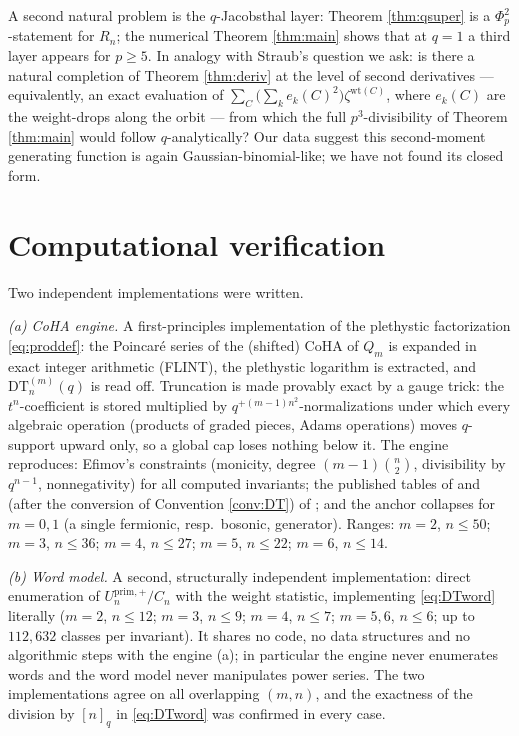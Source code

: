 \documentclass[11pt]{amsart}
\theoremstyle{definition}
\newcommand{\DT}{\mathrm{DT}}
\newcommand{\wt}{\mathrm{wt}}
\newcommand{\prim}{\mathrm{prim}}
\begin{document}
A second natural problem is the $q$-Jacobsthal layer: Theorem \ref{thm:qsuper} is a $\Phi_p^2$-statement for $R_n$; the numerical Theorem \ref{thm:main} shows that at $q=1$ a third layer appears for $p\ge5$. In analogy with Straub's question \cite[Rem.~6]{Straub} we ask: is there a natural completion of Theorem \ref{thm:deriv} at the level of second derivatives --- equivalently, an exact evaluation of $\sum_{C}\big(\sum_k e_k(C)^2\big)\zeta^{\wt(C)}$, where $e_k(C)$ are the weight-drops along the orbit --- from which the full $p^3$-divisibility of Theorem \ref{thm:main} would follow $q$-analytically? Our data suggest this second-moment generating function is again Gaussian-binomial-like; we have not found its closed form.

\section{Computational verification}\label{sec:verify}

Two independent implementations were written.

\emph{(a) CoHA engine.} A first-principles implementation of the plethystic factorization \eqref{eq:proddef}: the Poincar\'e series of the (shifted) CoHA of $Q_m$ is expanded in exact integer arithmetic (FLINT), the plethystic logarithm is extracted, and $\DT^{(m)}_n(q)$ is read off. Truncation is made provably exact by a gauge trick: the $t^n$-coefficient is stored multiplied by $q^{+(m-1)n^2}$-normalizations under which every algebraic operation (products of graded pieces, Adams operations) moves $q$-support upward only, so a global cap loses nothing below it. The engine reproduces: Efimov's constraints (monicity, degree $(m-1)\binom n2$, divisibility by $q^{n-1}$, nonnegativity) for all computed invariants; the published tables of \cite{Rei1102} and (after the conversion of Convention \ref{conv:DT}) of \cite{KRSS}; and the anchor collapses for $m=0,1$ (a single fermionic, resp.\ bosonic, generator). Ranges: $m=2$, $n\le50$; $m=3$, $n\le36$; $m=4$, $n\le27$; $m=5$, $n\le22$; $m=6$, $n\le14$.

\emph{(b) Word model.} A second, structurally independent implementation: direct enumeration of $U^{\prim,+}_n/C_n$ with the weight statistic, implementing \eqref{eq:DTword} literally ($m=2$, $n\le12$; $m=3$, $n\le9$; $m=4$, $n\le7$; $m=5,6$, $n\le6$; up to $112{,}632$ classes per invariant). It shares no code, no data structures and no algorithmic steps with the engine (a); in particular the engine never enumerates words and the word model never manipulates power series. The two implementations agree on all overlapping $(m,n)$, and the exactness of the division by $[n]_q$ in \eqref{eq:DTword} was confirmed in every case.
\end{document}
